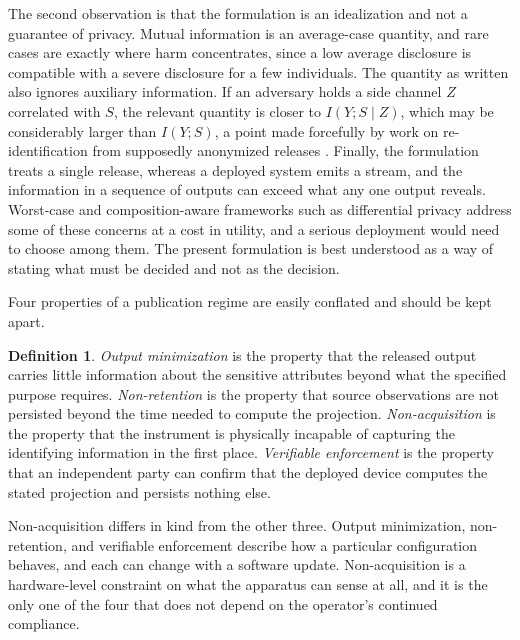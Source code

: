 \documentclass[11pt]{article}
\theoremstyle{definition}
\newtheorem{definition}{Definition}
\newcommand{\MI}{I}
\begin{document}
The second observation is that the formulation is an idealization and not a guarantee of privacy. Mutual information is an average-case quantity, and rare cases are exactly where harm concentrates, since a low average disclosure is compatible with a severe disclosure for a few individuals. The quantity as written also ignores auxiliary information. If an adversary holds a side channel $Z$ correlated with $S$, the relevant quantity is closer to $\MI(Y;S\mid Z)$, which may be considerably larger than $\MI(Y;S)$, a point made forcefully by work on re-identification from supposedly anonymized releases \cite{sweeney2000,narayanan2008}. Finally, the formulation treats a single release, whereas a deployed system emits a stream, and the information in a sequence of outputs can exceed what any one output reveals. Worst-case and composition-aware frameworks such as differential privacy \cite{dwork2006} address some of these concerns at a cost in utility, and a serious deployment would need to choose among them. The present formulation is best understood as a way of stating what must be decided and not as the decision.

Four properties of a publication regime are easily conflated and should be kept apart.

\begin{definition}
\emph{Output minimization} is the property that the released output carries little information about the sensitive attributes beyond what the specified purpose requires. \emph{Non-retention} is the property that source observations are not persisted beyond the time needed to compute the projection. \emph{Non-acquisition} is the property that the instrument is physically incapable of capturing the identifying information in the first place. \emph{Verifiable enforcement} is the property that an independent party can confirm that the deployed device computes the stated projection and persists nothing else.
\end{definition}

Non-acquisition differs in kind from the other three. Output minimization, non-retention, and verifiable enforcement describe how a particular configuration behaves, and each can change with a software update. Non-acquisition is a hardware-level constraint on what the apparatus can sense at all, and it is the only one of the four that does not depend on the operator's continued compliance.
\end{document}
